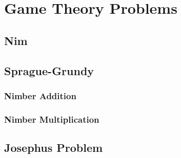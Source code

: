 \section{Game Theory Problems}

\subsection{Nim}

\subsection{Sprague-Grundy}

\subsubsection{Nimber Addition}

\subsubsection{Nimber Multiplication}

\subsection{Josephus Problem}
